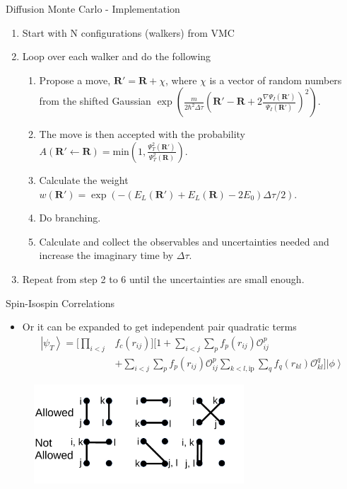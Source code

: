 \documentclass{beamer}
\newcommand{\ket}[1]{\left| #1 \right>}
\newcommand{\fpij}{f_p(r_{ij})}
\newcommand{\Opij}{\mathcal{O}_{ij}^p}
\newcommand{\fOpij}{\sum\limits_{i<j}\sum\limits_p \fpij\Opij}
\newcommand{\fqkl}{f_q(r_{kl})}
\newcommand{\Oqkl}{\mathcal{O}_{kl}^q}
\newcommand{\fOqklip}{\sum\limits_{k<l,\mathrm{ip}}\sum\limits_q \fqkl\Oqkl}
\newcommand{\R}{\mathbf{R}}
\begin{document}
\begin{frame}{Diffusion Monte Carlo - Implementation}
\begin{enumerate}
   \item Start with N configurations (walkers) from VMC
   \item Loop over each walker and do the following
   \begin{enumerate}
      \setlength\itemsep{0.2em}
      \item Propose a move, $\R' = \R + \chi$, where $\chi$ is a vector of random numbers from the shifted Gaussian $\exp\left(\frac{m}{2\hbar^2\Delta\tau}\left(\R'-\R+2\frac{\nabla\Psi_I(\R')}{\Psi_I(\R')}\right)^2\right)$.
      \item The move is then accepted with the probability $A(\R'\leftarrow\R)=\mathrm{min}\left(1,\frac{\Psi_T^2(\R')}{\Psi_T^2(\R)}\right)$.
      \item Calculate the weight $w(\R')=\exp\left(-\left(E_L(\R')+E_L(\R)-2E_0\right)\Delta\tau/2\right)$.
      \item Do branching.
      \item Calculate and collect the observables and uncertainties needed and increase the imaginary time by $\Delta\tau$.
   \end{enumerate}
   \item Repeat from step 2 to 6 until the uncertainties are small enough.
\end{enumerate}
\end{frame}

\begin{frame}{Spin-Isospin Correlations}
\begin{itemize}
   \item Or it can be expanded to get independent pair quadratic terms
   \begin{equation*}
   \begin{split}
      \ket{\psi_T} = \Bigg[\prod\limits_{i<j}&f_c(r_{ij})\Bigg] \Bigg[1+\fOpij \\
      & + \fOpij\fOqklip \Bigg] \ket{\phi}
   \end{split}
   \end{equation*}
\end{itemize}
\begin{figure}[h]
   \centering
   \includegraphics[width=0.7\textwidth]{pairing.pdf}
\end{figure}
\end{frame}
\end{document}
